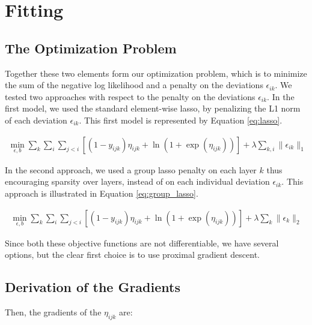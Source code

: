 \documentclass{article}
\begin{document}
\section{Fitting}
\subsection{The Optimization Problem}

Together these two elements form our optimization problem, which is to minimize the sum of the negative log likelihood and a penalty on the deviations $\epsilon_{ik}$. We tested two approaches with respect to the penalty on the deviations $\epsilon_{ik}$. In the first model, we used the standard element-wise lasso, by penalizing the L1 norm of each deviation $\epsilon_{ik}$. This first model is represented by Equation \ref{eq:lasso}.

\begin{align} \label{eq:lasso}
\min_{\epsilon, b} \sum_k \sum_{i} \sum_{j < i} [ (1 - y_{ijk})\eta_{ijk} +  \ln (1+\exp(\eta_{ijk})) ] + \lambda \sum_{k,i} \| \epsilon_{ik}\|_1
\end{align}

In the second approach, we used a group lasso penalty on each layer $k$ thus encouraging sparsity over layers, instead of on each individual deviation $\epsilon_{ik}$. This approach is illustrated in Equation \ref{eq:group_lasso}.

\begin{align} \label{eq:group_lasso}
\min_{\epsilon, b} \sum_k \sum_{i} \sum_{j < i} [ (1 - y_{ijk})\eta_{ijk} +  \ln (1+\exp(\eta_{ijk})) ] + \lambda \sum_k \| \epsilon_{k}\|_2
\end{align}

Since both these objective functions are not differentiable, we have several options, but the clear first choice is to use proximal gradient descent. %

\subsection{Derivation of the Gradients}


Then, the gradients of the $\eta_{ijk}$ are:
\end{document}
